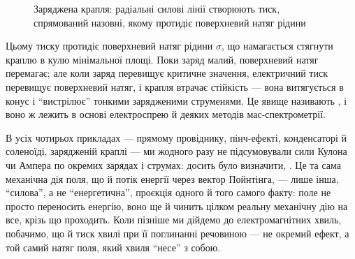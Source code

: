 \begin{figure}[h!]\centering
	\caption{Заряджена крапля: радіальні силові лінії створюють тиск, спрямований назовні, якому протидіє поверхневий
		натяг рідини\label{pic:ChargedDroplet}}
\end{figure}

Цьому тиску протидіє поверхневий натяг рідини $\sigma$, що намагається стягнути краплю в кулю мінімальної площі. Поки заряд малий, поверхневий
натяг перемагає; але коли заряд перевищує критичне значення, електричний тиск перевищує поверхневий натяг, і крапля втрачає стійкість --- вона
витягується в конус і \enquote{вистрілює} тонкими зарядженими струменями. Це явище називають , і воно ж лежить в основі
електроспрею й деяких методів мас-спектрометрії.

\begin{Attention}
	В усіх чотирьох прикладах --- прямому провіднику, пінч-ефекті, конденсаторі й соленоїді, зарядженій краплі --- ми жодного разу не
	підсумовували сили Кулона чи Ампера по окремих зарядах і струмах: досить було визначити, . Це та сама механічна дія поля, що й потік енергії через вектор Пойнтінга, --- лише інша, \enquote{силова}, а не
	\enquote{енергетична}, проєкція одного й того самого факту: поле не просто переносить енергію, воно ще й чинить цілком реальну механічну дію
	на все, крізь що проходить. Коли пізніше ми дійдемо до електромагнітних хвиль, побачимо, що й тиск хвилі при її поглинанні речовиною --- не
	окремий ефект, а той самий натяг поля, який хвиля \enquote{несе} з собою.
\end{Attention}